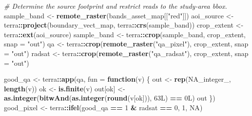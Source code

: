 \documentclass[
]{article}
\newenvironment{Shaded}{\begin{snugshade}}{\end{snugshade}}
\newcommand{\AttributeTok}[1]{\textcolor[rgb]{0.13,0.29,0.53}{#1}}
\newcommand{\CommentTok}[1]{\textcolor[rgb]{0.56,0.35,0.01}{\textit{#1}}}
\newcommand{\ConstantTok}[1]{\textcolor[rgb]{0.56,0.35,0.01}{#1}}
\newcommand{\ControlFlowTok}[1]{\textcolor[rgb]{0.13,0.29,0.53}{\textbf{#1}}}
\newcommand{\DataTypeTok}[1]{\textcolor[rgb]{0.13,0.29,0.53}{#1}}
\newcommand{\DecValTok}[1]{\textcolor[rgb]{0.00,0.00,0.81}{#1}}
\newcommand{\FunctionTok}[1]{\textcolor[rgb]{0.13,0.29,0.53}{\textbf{#1}}}
\newcommand{\NormalTok}[1]{#1}
\newcommand{\OtherTok}[1]{\textcolor[rgb]{0.56,0.35,0.01}{#1}}
\newcommand{\SpecialCharTok}[1]{\textcolor[rgb]{0.81,0.36,0.00}{\textbf{#1}}}
\newcommand{\StringTok}[1]{\textcolor[rgb]{0.31,0.60,0.02}{#1}}
\begin{document}
\begin{Shaded}
\begin{Highlighting}[]
  \CommentTok{\# Determine the source footprint and restrict reads to the study{-}area bbox.}
\NormalTok{  sample\_band }\OtherTok{\textless{}{-}} \FunctionTok{remote\_raster}\NormalTok{(bands\_asset\_map[[}\StringTok{"red"}\NormalTok{]])}
\NormalTok{  aoi\_source }\OtherTok{\textless{}{-}}\NormalTok{ terra}\SpecialCharTok{::}\FunctionTok{project}\NormalTok{(boundary\_vect\_map, terra}\SpecialCharTok{::}\FunctionTok{crs}\NormalTok{(sample\_band))}
\NormalTok{  crop\_extent }\OtherTok{\textless{}{-}}\NormalTok{ terra}\SpecialCharTok{::}\FunctionTok{ext}\NormalTok{(aoi\_source)}
\NormalTok{  sample\_band }\OtherTok{\textless{}{-}}\NormalTok{ terra}\SpecialCharTok{::}\FunctionTok{crop}\NormalTok{(sample\_band, crop\_extent, }\AttributeTok{snap =} \StringTok{"out"}\NormalTok{)}
\NormalTok{  qa }\OtherTok{\textless{}{-}}\NormalTok{ terra}\SpecialCharTok{::}\FunctionTok{crop}\NormalTok{(}\FunctionTok{remote\_raster}\NormalTok{(}\StringTok{"qa\_pixel"}\NormalTok{), crop\_extent, }\AttributeTok{snap =} \StringTok{"out"}\NormalTok{)}
\NormalTok{  radsat }\OtherTok{\textless{}{-}}\NormalTok{ terra}\SpecialCharTok{::}\FunctionTok{crop}\NormalTok{(}\FunctionTok{remote\_raster}\NormalTok{(}\StringTok{"qa\_radsat"}\NormalTok{), crop\_extent, }\AttributeTok{snap =} \StringTok{"out"}\NormalTok{)}

\NormalTok{  good\_qa }\OtherTok{\textless{}{-}}\NormalTok{ terra}\SpecialCharTok{::}\FunctionTok{app}\NormalTok{(qa, }\AttributeTok{fun =} \ControlFlowTok{function}\NormalTok{(v) \{}
\NormalTok{    out }\OtherTok{\textless{}{-}} \FunctionTok{rep}\NormalTok{(}\ConstantTok{NA\_integer\_}\NormalTok{, }\FunctionTok{length}\NormalTok{(v))}
\NormalTok{    ok }\OtherTok{\textless{}{-}} \FunctionTok{is.finite}\NormalTok{(v)}
\NormalTok{    out[ok] }\OtherTok{\textless{}{-}} \FunctionTok{as.integer}\NormalTok{(}\FunctionTok{bitwAnd}\NormalTok{(}\FunctionTok{as.integer}\NormalTok{(}\FunctionTok{round}\NormalTok{(v[ok])), }\DecValTok{63}\DataTypeTok{L}\NormalTok{) }\SpecialCharTok{==} \DecValTok{0}\DataTypeTok{L}\NormalTok{)}
\NormalTok{    out}
\NormalTok{  \})}
\NormalTok{  good\_pixel }\OtherTok{\textless{}{-}}\NormalTok{ terra}\SpecialCharTok{::}\FunctionTok{ifel}\NormalTok{(good\_qa }\SpecialCharTok{==} \DecValTok{1} \SpecialCharTok{\&}\NormalTok{ radsat }\SpecialCharTok{==} \DecValTok{0}\NormalTok{, }\DecValTok{1}\NormalTok{, }\ConstantTok{NA}\NormalTok{)}


\end{Highlighting}
\end{Shaded}
\end{document}

